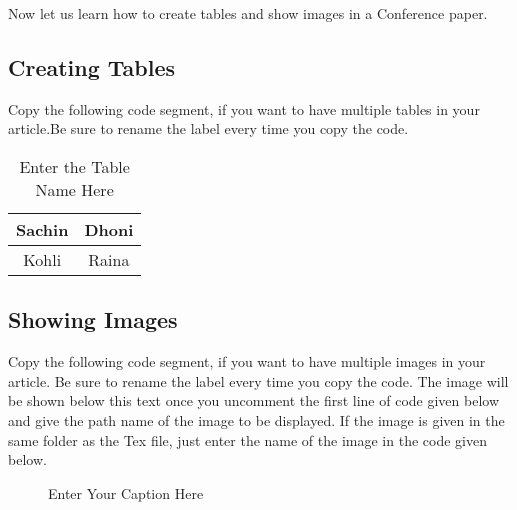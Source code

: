 \documentclass[a4paper, 10pt, conference]{ieeeconf}      %
\begin{document}
Now let us learn how to create tables and show images in a Conference paper.   

\subsection{Creating Tables}
Copy the following code segment, if you want to have multiple tables in your article.Be sure to
rename the label every time you copy the code.


\begin{table}[h]
\caption{Enter the Table Name Here}
\label{table_example1}
\begin{center}
\begin{tabular}{|c||c|}
\hline
Sachin & Dhoni\\
\hline
Kohli & Raina\\
\hline
\end{tabular}
\end{center}
\end{table}




\subsection{Showing Images}
Copy the following code segment, if you want to have multiple images\cite{c1} in your article. Be sure to
rename the label every time you copy the code.
The image will be shown below this text once you uncomment the first line of code given 
below and give the path name of the image to be displayed. If the image is given in the
same folder as the Tex file, just enter the name of the image in the code given below. 

   \begin{figure}[thpb]
      \centering
      \caption{Enter Your Caption Here}
      \label{img_label1}
   \end{figure}
   
\end{document}
